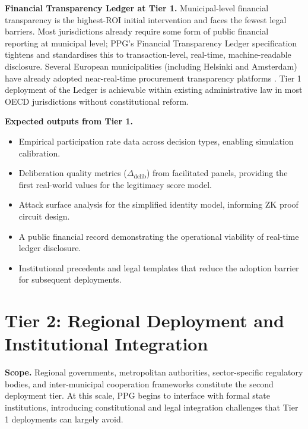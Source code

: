 \documentclass[12pt,a4paper,oneside]{report}
\begin{document}
\textbf{Financial Transparency Ledger at Tier 1.} Municipal-level financial transparency is the highest-ROI initial intervention and faces the fewest legal barriers. Most jurisdictions already require some form of public financial reporting at municipal level; PPG's Financial Transparency Ledger specification tightens and standardises this to transaction-level, real-time, machine-readable disclosure. Several European municipalities (including Helsinki and Amsterdam) have already adopted near-real-time procurement transparency platforms \citep{ocp2019ocds}. Tier 1 deployment of the Ledger is achievable within existing administrative law in most OECD jurisdictions without constitutional reform.

\textbf{Expected outputs from Tier 1.}
\begin{itemize}
  \item Empirical participation rate data across decision types, enabling simulation calibration.
  \item Deliberation quality metrics ($\Delta_{\text{delib}}$) from facilitated panels, providing the first real-world values for the legitimacy score model.
  \item Attack surface analysis for the simplified identity model, informing ZK proof circuit design.
  \item A public financial record demonstrating the operational viability of real-time ledger disclosure.
  \item Institutional precedents and legal templates that reduce the adoption barrier for subsequent deployments.
\end{itemize}

\section{Tier 2: Regional Deployment and Institutional Integration}

\textbf{Scope.} Regional governments, metropolitan authorities, sector-specific regulatory bodies, and inter-municipal cooperation frameworks constitute the second deployment tier. At this scale, PPG begins to interface with formal state institutions, introducing constitutional and legal integration challenges that Tier 1 deployments can largely avoid.
\end{document}
